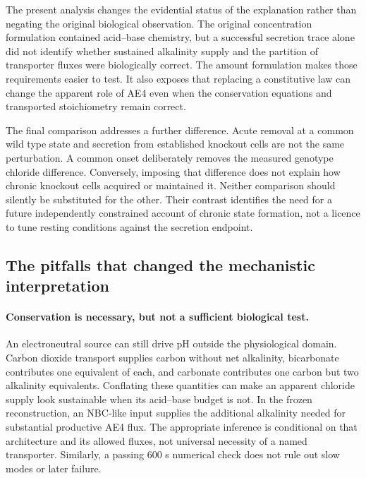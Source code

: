 The present analysis changes the evidential status of the explanation rather than negating the original biological observation. The original concentration formulation contained acid--base chemistry, but a successful secretion trace alone did not identify whether sustained alkalinity supply and the partition of transporter fluxes were biologically correct. The amount formulation makes those requirements easier to test. It also exposes that replacing a constitutive law can change the apparent role of AE4 even when the conservation equations and transported stoichiometry remain correct.

The final comparison addresses a further difference. Acute removal at a common wild type state and secretion from established knockout cells are not the same perturbation. A common onset deliberately removes the measured genotype chloride difference. Conversely, imposing that difference does not explain how chronic knockout cells acquired or maintained it. Neither comparison should silently be substituted for the other. Their contrast identifies the need for a future independently constrained account of chronic state formation, not a licence to tune resting conditions against the secretion endpoint.

\subsection{The pitfalls that changed the mechanistic interpretation}
\label{sec:pitfalls}

\paragraph{Conservation is necessary, but not a sufficient biological test.}
An electroneutral source can still drive pH outside the physiological domain. Carbon dioxide transport supplies carbon without net alkalinity, bicarbonate contributes one equivalent of each, and carbonate contributes one carbon but two alkalinity equivalents. Conflating these quantities can make an apparent chloride supply look sustainable when its acid--base budget is not. In the frozen reconstruction, an NBC-like input supplies the additional alkalinity needed for substantial productive AE4 flux. The appropriate inference is conditional on that architecture and its allowed fluxes, not universal necessity of a named transporter. Similarly, a passing 600 s numerical check does not rule out slow modes or later failure.

